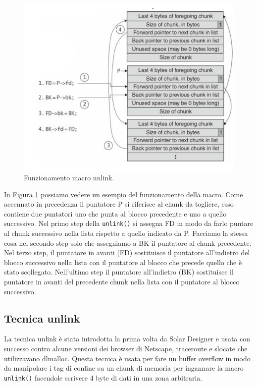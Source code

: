 \begin{figure}[H]
    \centering
    \includegraphics[width=12cm, keepaspectratio]{capitoli/secure_coding/img/cap_4/ulink.png}
    \caption{Funzionamento macro unlink.}\label{fig:ulink}
\end{figure}

In Figura \ref{fig:ulink} possiamo vedere un esempio del funzionamento della macro. Come accennato in precedenza il puntatore P si riferisce al chunk da togliere, esso contiene due puntatori uno che punta al blocco precedente e uno a quello successivo. Nel primo step della \verb|unlink()| si assegna FD in modo da farlo puntare al chunk successivo nella lista rispetto a quello indicato da P. Facciamo la stessa cosa nel secondo step solo che assegniamo a BK il puntatore al chunk precedente. Nel terzo step, il puntatore in avanti (FD)  sostituisce il puntatore all'indietro del blocco successivo nella lista con il puntatore al blocco che precede quello che è stato scollegato. Nell'ultimo step il puntatore all'indietro (BK) sostituisce il puntatore in avanti del precedente chunk nella lista con il puntatore al blocco successivo.

\subsection{Tecnica unlink}

La tecnica unlink è stata introdotta la prima volta da Solar Designer e usata con
successo contro alcune versioni dei browser di Netscape, traceroute e slocate che
utilizzavano dlmalloc. Questa tecnica è usata per fare un buffer overflow in modo da
manipolare i tag di confine su un chunk di memoria per ingannare la macro \verb|unlink()|
facendole scrivere 4 byte di dati in una zona arbitraria.

